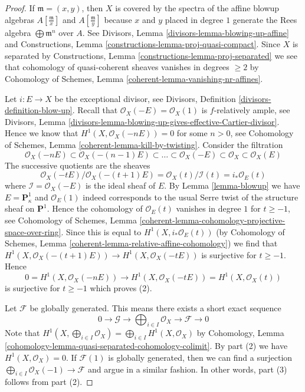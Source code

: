 \documentclass{stacks-project}
\theoremstyle{plain}
\theoremstyle{definition}
\theoremstyle{remark}
\numberwithin{equation}{subsection}
\begin{document}
\begin{proof}
If $\mathfrak m = (x, y)$, then $X$ is covered by the spectra
of the affine blowup algebras $A[\frac{\mathfrak m}{x}]$ and
$A[\frac{\mathfrak m}{y}]$ because $x$ and $y$ placed in degree $1$
generate the Rees algebra $\bigoplus \mathfrak m^n$ over $A$.
See Divisors, Lemma \ref{divisors-lemma-blowing-up-affine} and
Constructions, Lemma \ref{constructions-lemma-proj-quasi-compact}.
Since $X$ is separated by
Constructions, Lemma \ref{constructions-lemma-proj-separated}
we see that cohomology of quasi-coherent sheaves vanishes in
degrees $\geq 2$ by Cohomology of Schemes, Lemma
\ref{coherent-lemma-vanishing-nr-affines}.

\medskip\noindent
Let $i : E \to X$ be the exceptional divisor, see
Divisors, Definition \ref{divisors-definition-blow-up}.
Recall that $\mathcal{O}_X(-E) = \mathcal{O}_X(1)$ is
$f$-relatively ample, see
Divisors, Lemma \ref{divisors-lemma-blowing-up-gives-effective-Cartier-divisor}.
Hence we know that $H^1(X, \mathcal{O}_X(-nE)) = 0$ for some $n > 0$,
see Cohomology of Schemes, Lemma \ref{coherent-lemma-kill-by-twisting}.
Consider the filtration
$$
\mathcal{O}_X(-nE) \subset \mathcal{O}_X(-(n - 1)E) \subset
\ldots \subset \mathcal{O}_X(-E) \subset \mathcal{O}_X \subset \mathcal{O}_X(E)
$$
The successive quotients are the sheaves
$$
\mathcal{O}_X(-t E)/\mathcal{O}_X(-(t + 1)E) =
\mathcal{O}_X(t)/\mathcal{I}(t) =
i_*\mathcal{O}_E(t)
$$
where $\mathcal{I} = \mathcal{O}_X(-E)$ is the ideal sheaf of $E$.
By Lemma \ref{lemma-blowup} we have $E = \mathbf{P}^1_\kappa$ and
$\mathcal{O}_E(1)$ indeed corresponds to the usual Serre twist of
the structure sheaf on $\mathbf{P}^1$. Hence the cohomology
of $\mathcal{O}_E(t)$ vanishes in degree $1$ for $t \geq -1$, see
Cohomology of Schemes, Lemma
\ref{coherent-lemma-cohomology-projective-space-over-ring}.
Since this is equal to $H^1(X, i_*\mathcal{O}_E(t))$ (by
Cohomology of Schemes, Lemma \ref{coherent-lemma-relative-affine-cohomology})
we find that $H^1(X, \mathcal{O}_X(-(t + 1)E)) \to H^1(X, \mathcal{O}_X(-tE))$
is surjective for $t \geq -1$. Hence
$$
0 = H^1(X, \mathcal{O}_X(-nE))
\longrightarrow
H^1(X, \mathcal{O}_X(-tE)) = H^1(X, \mathcal{O}_X(t))
$$
is surjective for $t \geq -1$ which proves (2).

\medskip\noindent
Let $\mathcal{F}$ be globally generated. This means there exists
a short exact sequence
$$
0 \to \mathcal{G} \to \bigoplus\nolimits_{i \in I} \mathcal{O}_X
\to \mathcal{F} \to 0
$$
Note that $H^1(X, \bigoplus_{i \in I} \mathcal{O}_X) =
\bigoplus_{i \in I} H^1(X, \mathcal{O}_X)$ by
Cohomology, Lemma \ref{cohomology-lemma-quasi-separated-cohomology-colimit}.
By part (2) we have $H^1(X, \mathcal{O}_X) = 0$.
If $\mathcal{F}(1)$ is globally generated, then we can find a
surjection $\bigoplus_{i \in I} \mathcal{O}_X(-1) \to \mathcal{F}$
and argue in a similar fashion.
In other words, part (3) follows from part (2).


\end{proof}
\end{document}
